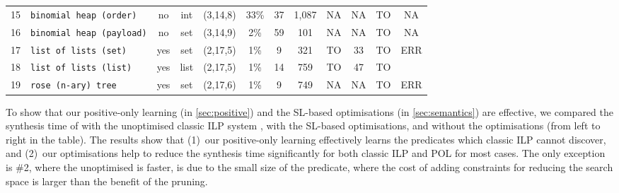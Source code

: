 \begin{table}[t]
\begin{adjustbox}{width=0.98\textwidth}
\begin{tabular}{cl@{\ }|ccc@{\ }|@{\ }ccc|ccc|c}
          15 &\texttt{binomial heap (order)}& no  & int&             (3,14,8) & 33\% & 37 & 1,087  & NA &NA & TO & NA \\
          16 &\texttt{binomial heap (payload)}& no & set&            (3,14,9) & 2\% & 59 & 101  & NA & NA & TO & NA \\
          17 &\texttt{list of lists (set)}& yes & set&                     (2,17,5) & 1\% & 9 &321  & TO & 33 & TO & \multirow{2}{*}{{{ERR}}} \\
          18 &\texttt{list of lists (list)}& yes & list&                      (2,17,5) & 1\%  &14 &759 & TO & 47 & TO  \\
          19 &\texttt{rose (n-ary) tree}& yes & set&                 (2,17,6) & 1\% &9 &749 & NA & NA & TO & ERR \\
          \bottomrule
          \end{tabular}%

  \end{adjustbox}
    
%
\end{table}


To show that our positive-only learning (in \autoref{sec:positive})
and the SL-based optimisations (in \autoref{sec:semantics}) are
effective, we compared the synthesis time of \tool with the
unoptimised classic ILP system \popper, \popper with the SL-based
optimisations, and \tool without the optimisations (from left to
right in the table).
%
The results show that (1)~our positive-only learning effectively
learns the predicates which classic ILP cannot discover, and (2)~our
optimisations help to reduce the synthesis time significantly for both
classic ILP and POL for most cases. 
%
The only exception is \#2, where the unoptimised \tool is faster, is
due to the small size of the predicate, where the cost of adding
constraints for reducing the search space is larger than the benefit
of the pruning.
%

